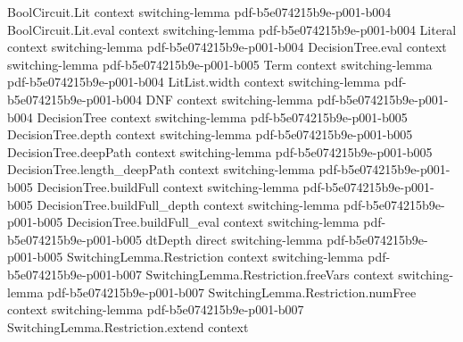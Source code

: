 \begin{lemma}
\label{SwitchingBernoulli.switching_fixedSize_bound_small}
\leanok
{}
\proofstep
  {BoolCircuit.Lit}
  {context}
  {switching-lemma}
  {pdf-b5e074215b9e-p001-b004}
\proofstep
  {BoolCircuit.Lit.eval}
  {context}
  {switching-lemma}
  {pdf-b5e074215b9e-p001-b004}
\proofstep
  {Literal}
  {context}
  {switching-lemma}
  {pdf-b5e074215b9e-p001-b004}
\proofstep
  {DecisionTree.eval}
  {context}
  {switching-lemma}
  {pdf-b5e074215b9e-p001-b005}
\proofstep
  {Term}
  {context}
  {switching-lemma}
  {pdf-b5e074215b9e-p001-b004}
\proofstep
  {LitList.width}
  {context}
  {switching-lemma}
  {pdf-b5e074215b9e-p001-b004}
\proofstep
  {DNF}
  {context}
  {switching-lemma}
  {pdf-b5e074215b9e-p001-b004}
\proofstep
  {DecisionTree}
  {context}
  {switching-lemma}
  {pdf-b5e074215b9e-p001-b005}
\proofstep
  {DecisionTree.depth}
  {context}
  {switching-lemma}
  {pdf-b5e074215b9e-p001-b005}
\proofstep
  {DecisionTree.deepPath}
  {context}
  {switching-lemma}
  {pdf-b5e074215b9e-p001-b005}
\proofstep
  {DecisionTree.length_deepPath}
  {context}
  {switching-lemma}
  {pdf-b5e074215b9e-p001-b005}
\proofstep
  {DecisionTree.buildFull}
  {context}
  {switching-lemma}
  {pdf-b5e074215b9e-p001-b005}
\proofstep
  {DecisionTree.buildFull_depth}
  {context}
  {switching-lemma}
  {pdf-b5e074215b9e-p001-b005}
\proofstep
  {DecisionTree.buildFull_eval}
  {context}
  {switching-lemma}
  {pdf-b5e074215b9e-p001-b005}
\proofstep
  {dtDepth}
  {direct}
  {switching-lemma}
  {pdf-b5e074215b9e-p001-b005}
\proofstep
  {SwitchingLemma.Restriction}
  {context}
  {switching-lemma}
  {pdf-b5e074215b9e-p001-b007}
\proofstep
  {SwitchingLemma.Restriction.freeVars}
  {context}
  {switching-lemma}
  {pdf-b5e074215b9e-p001-b007}
\proofstep
  {SwitchingLemma.Restriction.numFree}
  {context}
  {switching-lemma}
  {pdf-b5e074215b9e-p001-b007}
\proofstep
  {SwitchingLemma.Restriction.extend}
  {context}

\end{lemma}
